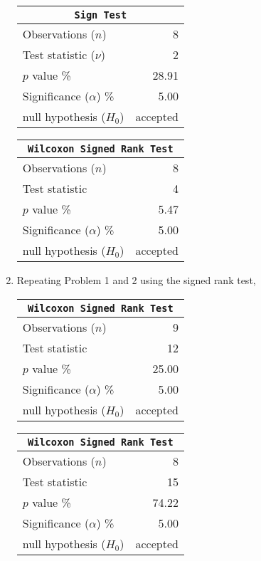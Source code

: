 \begin{enumerate}
	
	\begin{table}[H]
		\centering
		\begin{tabular}{@{}lr@{}}
			\toprule
			\multicolumn{2}{c}{\texttt{Sign Test}} \\
			\midrule
			Observations ($n$)         &         8 \\
			Test statistic ($\nu$)     &         2 \\
			$p$ value \%               &     28.91 \\
			Significance ($\alpha$) \% &      5.00 \\
			null hypothesis ($H_0$)    &  accepted \\
			\bottomrule
		\end{tabular}
		\qquad
		\begin{tabular}{@{}lr@{}}
			\toprule
			\multicolumn{2}{c}{\texttt{Wilcoxon Signed Rank Test}} \\
			\midrule
			Observations ($n$)         &         8 \\
			Test statistic             &         4 \\
			$p$ value \%               &      5.47 \\
			Significance ($\alpha$) \% &      5.00 \\
			null hypothesis ($H_0$)    &  accepted \\
			\bottomrule
		\end{tabular}
	\end{table}
	\bigskip
	
	\item Repeating Problem 1 and 2 using the signed rank test,
	
	\begin{table}[H]
		\centering
		\begin{tabular}{@{}lr@{}}
			\toprule
			\multicolumn{2}{c}{\texttt{Wilcoxon Signed Rank Test}} \\
			\midrule
			Observations ($n$)         &         9 \\
			Test statistic             &        12 \\
			$p$ value \%               &     25.00 \\
			Significance ($\alpha$) \% &      5.00 \\
			null hypothesis ($H_0$)    &  accepted \\
			\bottomrule
		\end{tabular}
	\qquad
		\begin{tabular}{@{}lr@{}}
			\toprule
			\multicolumn{2}{c}{\texttt{Wilcoxon Signed Rank Test}} \\
			\midrule
			Observations ($n$)         &         8 \\
			Test statistic             &        15 \\
			$p$ value \%               &     74.22 \\
			Significance ($\alpha$) \% &      5.00 \\
			null hypothesis ($H_0$)    &  accepted \\
			\bottomrule
		\end{tabular}
		

\end{table}
\end{enumerate}
